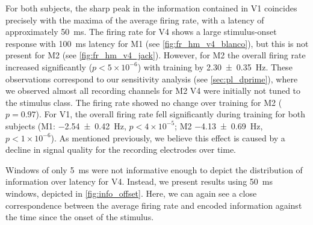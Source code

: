 For both subjects, the sharp peak in the information contained in \ac{V1} coincides precisely with the maxima of the average firing rate, with a latency of approximately \SI{50}{\milli\second}.
The firing rate for \ac{V4} shows a large stimulus-onset response with \SI{100}{\milli\second} latency for \ac{M1} (see \autoref{fig:fr_hm_v4_blanco}), but this is not present for \ac{M2} (see \autoref{fig:fr_hm_v4_jack}).
However, for \ac{M2} the overall firing rate increased significantly ($p < 5 \times 10^{-6}$) with training by \SI{2.30\pm0.35}{Hz}.
These observations correspond to our sensitivity analysis (see \autoref{sec:pl_dprime}), where we observed almost all recording channels for \ac{M2} \ac{V4} were initially not tuned to the stimulus class.
The firing rate showed no change over training for \ac{M2} ($p=0.97$).
For \ac{V1}, the overall firing rate fell significantly during training for both subjects (\ac{M1}: \SI{-2.54\pm0.42}{Hz}, $p < 4 \times 10^{-5}$; \ac{M2} \SI{-4.13\pm0.69}{Hz}, $p < 1 \times 10^{-6}$).
As mentioned previously, we believe this effect is caused by a decline in signal quality for the recording electrodes over time.

Windows of only \SI{5}{\milli\second} were not informative enough to depict the distribution of information over latency for \ac{V4}.
Instead, we present results using \SI{50}{\milli\second} windows, depicted in \autoref{fig:info_offset}.
Here, we can again see a close correspondence between the average firing rate and encoded information against the time since the onset of the stimulus.

